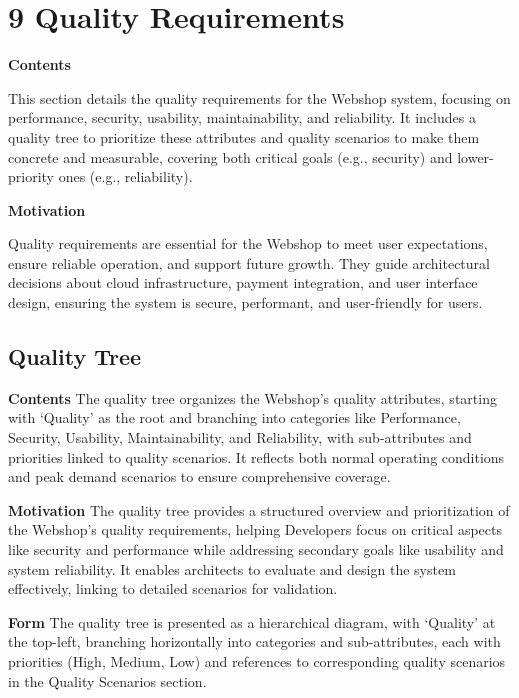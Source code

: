 \hypertarget{section-quality-scenarios}{%
\section{9 Quality Requirements}\label{section-quality-scenarios}}

\textbf{Contents}

This section details the quality requirements for the Webshop system, focusing on performance, security, usability, maintainability, and reliability. It includes a quality tree to prioritize these attributes and quality scenarios to make them concrete and measurable, covering both critical goals (e.g., security) and lower-priority ones (e.g., reliability).

\textbf{Motivation}

Quality requirements are essential for the Webshop to meet user expectations, ensure reliable operation, and support future growth. They guide architectural decisions about cloud infrastructure, payment integration, and user interface design, ensuring the system is secure, performant, and user-friendly for users.

\hypertarget{_quality_tree}{%
\subsection{Quality Tree}\label{_quality_tree}}

\textbf{Contents}
The quality tree organizes the Webshop’s quality attributes, starting with ‘Quality’ as the root and branching into categories like Performance, Security, Usability, Maintainability, and Reliability, with sub-attributes and priorities linked to quality scenarios. It reflects both normal operating conditions and peak demand scenarios to ensure comprehensive coverage.

\textbf{Motivation}
The quality tree provides a structured overview and prioritization of the Webshop’s quality requirements, helping Developers focus on critical aspects like security and performance while addressing secondary goals like usability and system reliability. It enables architects to evaluate and design the system effectively, linking to detailed scenarios for validation.

\textbf{Form}
The quality tree is presented as a hierarchical diagram, with ‘Quality’ at the top-left, branching horizontally into categories and sub-attributes, each with priorities (High, Medium, Low) and references to corresponding quality scenarios in the Quality Scenarios section.

